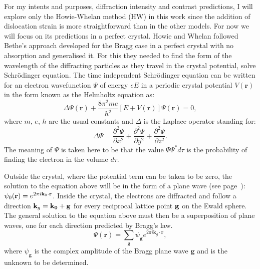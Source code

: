 For my intents and purposes, \ie diffraction intensity and contrast predictions, I will explore only the Howie-Whelan method (HW) in this work since the addition of dislocation strain is more straightforward than in the other models. For now we will focus on its predictions in a perfect crystal. Howie and Whelan followed Bethe's approach developed for the Bragg case in a perfect crystal with no absorption and generalised it. For this they needed to find the form of the wavelength of the diffracting particles as they travel in the crystal potential, \ie solve Schr{\"o}dinger equation. The time independent Schr{\"o}dinger equation can be written for an electron wavefunction $\Psi$ of energy $eE$ in a periodic crystal potential $V(\mathbf{r})$ in the form known as the Helmholtz equation as:
\begin{equation}
\label{eq:SE}
\Delta \Psi(\mathbf{r}) + \frac{8 \pi^2 m e}{h^2}\left[ E + V(\mathbf{r})\right]\Psi(\mathbf{r}) = 0,
\end{equation}
where $m$, $e$, $h$ are the usual constants and $\Delta$ is the Laplace operator standing for:
\begin{equation*}
\Delta \Psi = \frac{\partial^2 \Psi}{\partial x^2} + \frac{\partial^2 \Psi}{\partial y^2} + \frac{\partial^2 \Psi}{\partial z^2}.
\end{equation*}
The meaning of $\Psi$ is taken here to be that the value $\Psi \Psi^* d\tau$ is the probability of finding the electron in the volume $d\tau$. 

Outside the crystal, where the potential term can be taken to be zero, the solution to the equation above will be in the form of a plane wave (see page~\pageref{sec:wave}): $\psi_0(\vb{r}) = e^{2\pi i \vb{k}_0 \cdot \vb{r}}$. Inside the crystal, the electrons are diffracted and follow a direction $\vb{k}_g=\mathbf{k_0} + \mathbf{g}$ for every reciprocal lattice point $\vb{g}$ on the Ewald sphere. The general solution to the equation above must then be a superposition of plane waves, one for each direction predicted by Bragg's law. 
\begin{equation}
\label{eq:psiBragg}
    \Psi(\mathbf{r})= \sum_\mathbf{g} \psi_\mathbf{g} e^{2\pi i \mathbf{k}_g  \cdot \mathbf{r}},
\end{equation}
where $\psi_\mathbf{g}$ is the complex amplitude of the Bragg plane wave $\mathbf{g}$ and is the unknown to be determined.


